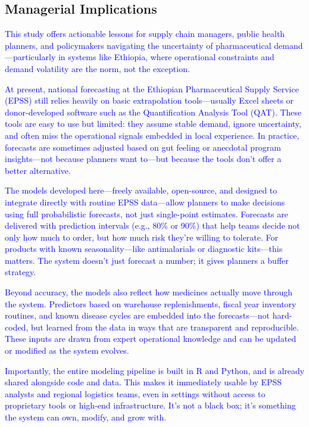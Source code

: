 \documentclass[
  authoryear,
  preprint,
  3p]{elsarticle}
\begin{document}
\subsection{Managerial Implications}\label{managerial-implications}

\textcolor{blue}{This study offers actionable lessons for supply chain managers, public health planners, and policymakers navigating the uncertainty of pharmaceutical demand—particularly in systems like Ethiopia, where operational constraints and demand volatility are the norm, not the exception.}

\textcolor{blue}{At present, national forecasting at the Ethiopian Pharmaceutical Supply Service (EPSS) still relies heavily on basic extrapolation tools—usually Excel sheets or donor-developed software such as the Quantification Analysis Tool (QAT). These tools are easy to use but limited: they assume stable demand, ignore uncertainty, and often miss the operational signals embedded in local experience. In practice, forecasts are sometimes adjusted based on gut feeling or anecdotal program insights—not because planners want to—but because the tools don’t offer a better alternative.}

\textcolor{blue}{The models developed here—freely available, open-source, and designed to integrate directly with routine EPSS data—allow planners to make decisions using full probabilistic forecasts, not just single-point estimates. Forecasts are delivered with prediction intervals (e.g., 80\% or 90\%) that help teams decide not only how much to order, but how much risk they’re willing to tolerate. For products with known seasonality—like antimalarials or diagnostic kits—this matters. The system doesn’t just forecast a number; it gives planners a buffer strategy.}

\textcolor{blue}{Beyond accuracy, the models also reflect how medicines actually move through the system. Predictors based on warehouse replenishments, fiscal year inventory routines, and known disease cycles are embedded into the forecasts—not hard-coded, but learned from the data in ways that are transparent and reproducible. These inputs are drawn from expert operational knowledge and can be updated or modified as the system evolves.}

\textcolor{blue}{Importantly, the entire modeling pipeline is built in R and Python, and is already shared alongside code and data. This makes it immediately usable by EPSS analysts and regional logistics teams, even in settings without access to proprietary tools or high-end infrastructure. It's not a black box; it's something the system can own, modify, and grow with.}
\end{document}
